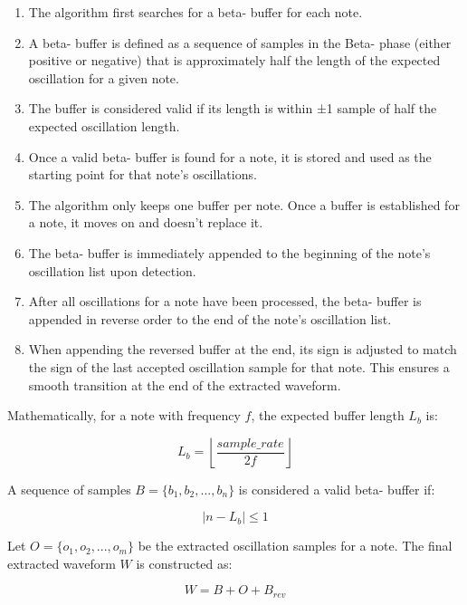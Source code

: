 \documentclass[12pt,a4paper]{article}
\begin{document}
\begin{enumerate}
    \item The algorithm first searches for a beta- buffer for each note.
    \item A beta- buffer is defined as a sequence of samples in the Beta- phase (either positive or negative) that is approximately half the length of the expected oscillation for a given note.
    \item The buffer is considered valid if its length is within ±1 sample of half the expected oscillation length.
    \item Once a valid beta- buffer is found for a note, it is stored and used as the starting point for that note's oscillations.
    \item The algorithm only keeps one buffer per note. Once a buffer is established for a note, it moves on and doesn't replace it.
    \item The beta- buffer is immediately appended to the beginning of the note's oscillation list upon detection.
    \item After all oscillations for a note have been processed, the beta- buffer is appended in reverse order to the end of the note's oscillation list.
    \item When appending the reversed buffer at the end, its sign is adjusted to match the sign of the last accepted oscillation sample for that note. This ensures a smooth transition at the end of the extracted waveform.
\end{enumerate}

Mathematically, for a note with frequency $f$, the expected buffer length $L_b$ is:

\begin{equation*}
L_b = \left\lfloor\frac{sample\_rate}{2f}\right\rfloor
\end{equation*}

A sequence of samples $B = \{b_1, b_2, ..., b_n\}$ is considered a valid beta- buffer if:

\begin{equation*}
|n - L_b| \leq 1
\end{equation*}

Let $O = \{o_1, o_2, ..., o_m\}$ be the extracted oscillation samples for a note. The final extracted waveform $W$ is constructed as:

\begin{equation*}
W = B + O + B_{rev}
\end{equation*}
\end{document}
